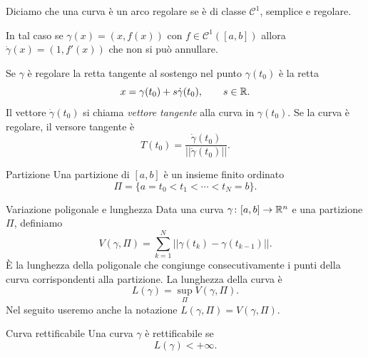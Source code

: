 \documentclass[a4paper]{article}
\begin{document}
\begin{snippetdefinition}{}
    Diciamo che una curva è un arco regolare se è di classe \(\mathcal{C}^1\),
    semplice e regolare.
\end{snippetdefinition}

In tal caso se \(\gamma(x) = (x, f(x))\) con \(f \in \mathcal{C}^1([a,b])\)
allora \(\dot\gamma(x) = (1, f'(x))\) che non si può annullare.

Se \(\gamma\) è regolare la retta tangente al sostengo nel punto \(\gamma(t_0)\) è
la retta
\[
    x=\gamma(t_0)+s\dot\gamma(t_0),
    \qquad s\in\mathbb{R}.
\]
Il vettore \(\dot\gamma(t_0)\) si chiama \emph{vettore tangente} alla curva in \(\gamma(t_0)\).
Se la curva è regolare, il versore tangente è
\[
    T(t_0)=\frac{\dot\gamma(t_0)}{||\dot\gamma(t_0)||}.
\]

\begin{snippetdefinition}{Partizione}
    Una partizione di \([a,b]\) è un insieme finito ordinato
    \[
        \Pi=\{a=t_0<t_1<\cdots<t_N=b\}.
    \]
\end{snippetdefinition}

\begin{snippetdefinition}{Variazione poligonale e lunghezza}
    Data una curva \(\gamma\colon[a,b]\to\mathbb{R}^n\) e una partizione \(\Pi\), definiamo
    \[
        V(\gamma,\Pi)=\sum_{k=1}^N||\gamma(t_k)-\gamma(t_{k-1})||.
    \]
    È la lunghezza della poligonale che congiunge consecutivamente i punti della curva
    corrispondenti alla partizione. La lunghezza della curva è
    \[
        L(\gamma)=\sup_\Pi V(\gamma,\Pi).
    \]
    Nel seguito useremo anche la notazione \(L(\gamma,\Pi)=V(\gamma,\Pi)\).
\end{snippetdefinition}

\begin{snippetdefinition}{Curva rettificabile}
    Una curva \(\gamma\) è rettificabile se
    \[
        L(\gamma)<+\infty.
    \]
\end{snippetdefinition}
\end{document}
